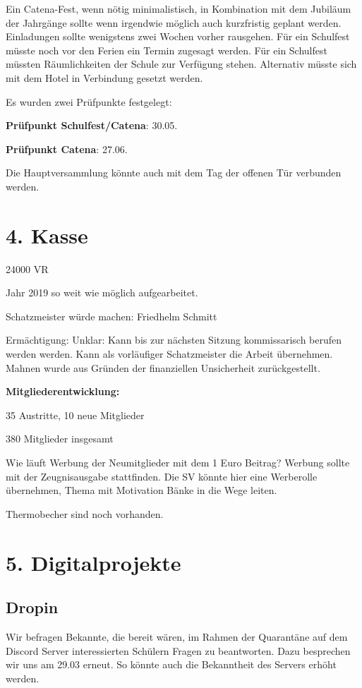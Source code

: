 \documentclass[a4paper, 11pt]{article}
\begin{document}
Ein Catena-Fest, wenn nötig minimalistisch, in Kombination mit dem Jubiläum der Jahrgänge sollte wenn irgendwie möglich auch kurzfristig geplant werden. Einladungen sollte wenigstens zwei Wochen vorher rausgehen.
Für ein Schulfest müsste noch vor den Ferien ein Termin zugesagt werden.
Für ein Schulfest müssten Räumlichkeiten der Schule zur Verfügung stehen. Alternativ müsste sich mit dem Hotel in Verbindung gesetzt werden.

Es wurden zwei Prüfpunkte festgelegt:

\textbf{Prüfpunkt Schulfest/Catena}: 30.05.

\textbf{Prüfpunkt Catena}: 27.06.
  
  
Die Hauptversammlung könnte auch mit dem Tag der offenen Tür verbunden werden.
 
\section*{4. Kasse}

24000 VR

Jahr 2019 so weit wie möglich aufgearbeitet.

Schatzmeister würde machen: Friedhelm Schmitt

Ermächtigung: Unklar: Kann bis zur nächsten Sitzung kommissarisch berufen werden werden.
Kann als vorläufiger Schatzmeister die Arbeit übernehmen.
Mahnen wurde aus Gründen der finanziellen Unsicherheit zurückgestellt.


\textbf{Mitgliederentwicklung:}

35 Austritte, 10 neue Mitglieder

380 Mitglieder insgesamt

Wie läuft Werbung der Neumitglieder mit dem 1 Euro Beitrag?
Werbung sollte mit der Zeugnisausgabe stattfinden.
Die SV könnte hier eine Werberolle übernehmen, Thema mit Motivation Bänke in die Wege leiten.

Thermobecher sind noch vorhanden.

\section*{5. Digitalprojekte}

\subsection*{Dropin}

Wir befragen Bekannte, die bereit wären, im Rahmen der Quarantäne auf dem Discord Server interessierten Schülern Fragen zu beantworten. Dazu besprechen wir uns am 29.03 erneut.
So könnte auch die Bekanntheit des Servers erhöht werden.
\end{document}

